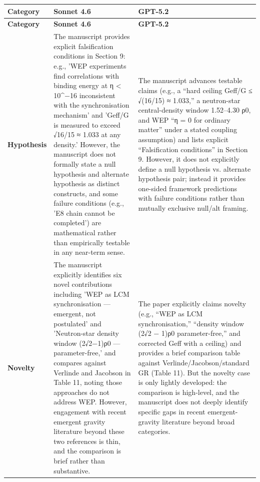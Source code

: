 \documentclass[11pt]{article}
\begin{document}
\begin{longtable}{@{} p{2.2cm} p{6.3cm} p{6.3cm} @{}}
\toprule
\textbf{Category} & \textbf{Sonnet 4.6} & \textbf{GPT-5.2} \\
\midrule
\endfirsthead
\toprule
\textbf{Category} & \textbf{Sonnet 4.6} & \textbf{GPT-5.2} \\
\midrule
\endhead
\bottomrule
\endlastfoot

\rowcolor{rowgray}
\textbf{Hypothesis} &
The manuscript provides explicit falsification conditions in Section 9: e.g., 'WEP experiments find correlations with binding energy at η < 10\textasciicircum{}−16 inconsistent with the synchronisation mechanism' and 'Geff/G is measured to exceed √16/15 ≈ 1.033 at any density.' However, the manuscript does not formally state a null hypothesis and alternate hypothesis as distinct constructs, and some failure conditions (e.g., 'E8 chain cannot be completed') are mathematical rather than empirically testable in any near-term sense. &
The manuscript advances testable claims (e.g., a “hard ceiling Geff/G ≤ √(16/15) ≈ 1.033,” a neutron-star central-density window 1.52–4.30 ρ0, and WEP “η = 0 for ordinary matter” under a stated coupling assumption) and lists explicit “Falsification conditions” in Section 9. However, it does not explicitly define a null hypothesis vs. alternate hypothesis pair; instead it provides one-sided framework predictions with failure conditions rather than mutually exclusive null/alt framing. \\[6pt]

\textbf{Novelty} &
The manuscript explicitly identifies six novel contributions including 'WEP as LCM synchronisation — emergent, not postulated' and 'Neutron-star density window (2√2−1)ρ0 — parameter-free,' and compares against Verlinde and Jacobson in Table 11, noting those approaches do not address WEP. However, engagement with recent emergent gravity literature beyond these two references is thin, and the comparison is brief rather than substantive. &
The paper explicitly claims novelty (e.g., “WEP as LCM synchronisation,” “density window (2√2 − 1)ρ0 parameter-free,” and corrected Geff with a ceiling) and provides a brief comparison table against Verlinde/Jacobson/standard GR (Table 11). But the novelty case is only lightly developed: the comparison is high-level, and the manuscript does not deeply identify specific gaps in recent emergent-gravity literature beyond broad categories. \\[6pt]


\end{longtable}
\end{document}
